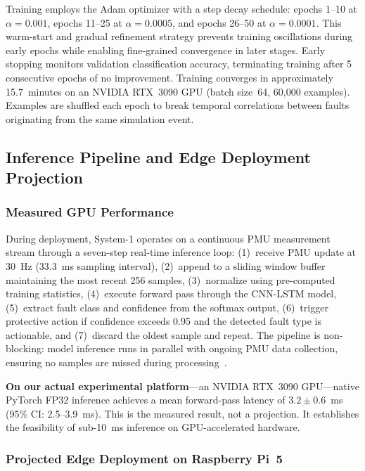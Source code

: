 \documentclass[journal]{IEEEtran}
\begin{document}
Training employs the Adam optimizer with a step decay schedule: epochs 1--10 at $\alpha = 0.001$, epochs 11--25 at $\alpha = 0.0005$, and epochs 26--50 at $\alpha = 0.0001$. This warm-start and gradual refinement strategy prevents training oscillations during early epochs while enabling fine-grained convergence in later stages. Early stopping monitors validation classification accuracy, terminating training after 5 consecutive epochs of no improvement. Training converges in approximately 15.7~minutes on an NVIDIA RTX~3090 GPU (batch size~64, 60,000 examples). Examples are shuffled each epoch to break temporal correlations between faults originating from the same simulation event.

\subsection{Inference Pipeline and Edge Deployment Projection}
\label{sec:inference}

\subsubsection{Measured GPU Performance}

During deployment, System-1 operates on a continuous PMU measurement stream through a seven-step real-time inference loop: (1)~receive PMU update at 30~Hz (33.3~ms sampling interval), (2)~append to a sliding window buffer maintaining the most recent 256 samples, (3)~normalize using pre-computed training statistics, (4)~execute forward pass through the CNN-LSTM model, (5)~extract fault class and confidence from the softmax output, (6)~trigger protective action if confidence exceeds 0.95 and the detected fault type is actionable, and (7)~discard the oldest sample and repeat. The pipeline is non-blocking: model inference runs in parallel with ongoing PMU data collection, ensuring no samples are missed during processing~\cite{ref29}.

\textbf{On our actual experimental platform}---an NVIDIA RTX~3090 GPU---native PyTorch FP32 inference achieves a mean forward-pass latency of $3.2 \pm 0.6$~ms (95\% CI: 2.5--3.9~ms). This is the measured result, not a projection. It establishes the feasibility of sub-10~ms inference on GPU-accelerated hardware.

\subsubsection{Projected Edge Deployment on Raspberry Pi~5}
\end{document}
